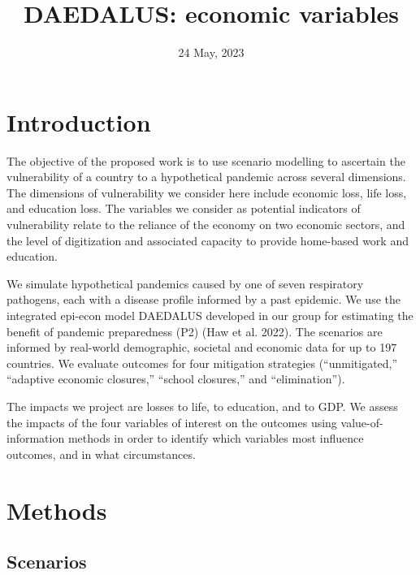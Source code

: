 \documentclass[
]{article}
\title{DAEDALUS: economic variables}
\author{}
\date{\vspace{-2.5em}24 May, 2023}
\begin{document}
\maketitle

{
\setcounter{tocdepth}{5}
\tableofcontents
}

\hypertarget{introduction}{%
\section{Introduction}\label{introduction}}

The objective of the proposed work is to use scenario modelling to ascertain the vulnerability of a country to a hypothetical pandemic across several dimensions. The dimensions of vulnerability we consider here include economic loss, life loss, and education loss. The variables we consider as potential indicators of vulnerability relate to the reliance of the economy on two economic sectors, and the level of digitization and associated capacity to provide home-based work and education.

We simulate hypothetical pandemics caused by one of seven respiratory pathogens, each with a disease profile informed by a past epidemic. We use the integrated epi-econ model DAEDALUS developed in our group for estimating the benefit of pandemic preparedness (P2) (Haw et al. 2022). The scenarios are informed by real-world demographic, societal and economic data for up to 197 countries. We evaluate outcomes for four mitigation strategies (``unmitigated,'' ``adaptive economic closures,'' ``school closures,'' and ``elimination'').

The impacts we project are losses to life, to education, and to GDP. We assess the impacts of the four variables of interest on the outcomes using value-of-information methods in order to identify which variables most influence outcomes, and in what circumstances.

\hypertarget{methods}{%
\section{Methods}\label{methods}}

\hypertarget{scenarios}{%
\subsection{Scenarios}\label{scenarios}}
\end{document}
